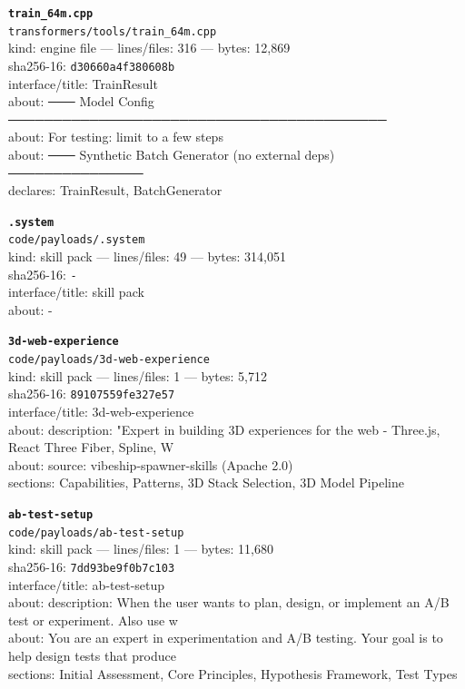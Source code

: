 \noindent\textbf{\texttt{train\_64m.cpp}}\\
\texttt{transformers/tools/train\_64m.cpp}\\
kind: engine file --- lines/files: 316 --- bytes: 12,869\\
sha256-16: \texttt{d30660a4f380608b}\\
interface/title: TrainResult\\
about: ─── Model Config ──────────────────────────────────────────\\
about: For testing: limit to a few steps\\
about: ─── Synthetic Batch Generator (no external deps) ───────────────\\
declares: TrainResult, BatchGenerator\\
\vspace*{6.0pt}

\noindent\textbf{\texttt{.system}}\\
\texttt{code/payloads/.system}\\
kind: skill pack --- lines/files: 49 --- bytes: 314,051\\
sha256-16: \texttt{-}\\
interface/title: skill pack\\
about: -\\
\vspace*{6.0pt}
\newpage

\noindent\textbf{\texttt{3d-web-experience}}\\
\texttt{code/payloads/3d-web-experience}\\
kind: skill pack --- lines/files: 1 --- bytes: 5,712\\
sha256-16: \texttt{89107559fe327e57}\\
interface/title: 3d-web-experience\\
about: description: "Expert in building 3D experiences for the web - Three.js, React Three Fiber, Spline, W\\
about: source: vibeship-spawner-skills (Apache 2.0)\\
sections: Capabilities, Patterns, 3D Stack Selection, 3D Model Pipeline\\
\vspace*{6.0pt}

\noindent\textbf{\texttt{ab-test-setup}}\\
\texttt{code/payloads/ab-test-setup}\\
kind: skill pack --- lines/files: 1 --- bytes: 11,680\\
sha256-16: \texttt{7dd93be9f0b7c103}\\
interface/title: ab-test-setup\\
about: description: When the user wants to plan, design, or implement an A/B test or experiment. Also use w\\
about: You are an expert in experimentation and A/B testing. Your goal is to help design tests that produce\\
sections: Initial Assessment, Core Principles, Hypothesis Framework, Test Types\\
\vspace*{6.0pt}

